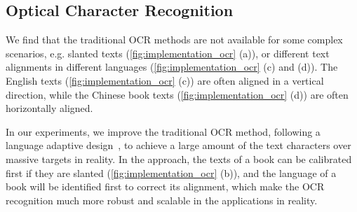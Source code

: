 



\subsection{Optical Character Recognition}


We find that the traditional OCR methods are not available for some complex scenarios,
e.g. slanted texts (\autoref{fig:implementation_ocr} (a)), %
or different text alignments in different languages (\autoref{fig:implementation_ocr} (c) and (d)).
The English texts (\autoref{fig:implementation_ocr} (c)) are often aligned in a vertical direction,
while the Chinese book texts (\autoref{fig:implementation_ocr} (d)) are often horizontally aligned.

In our experiments,
we improve the traditional OCR method, following a language adaptive design~\cite{Ling2018},
to achieve a large amount of the text characters over massive targets in reality.
In the approach, the texts of a book can be calibrated first if they are slanted (\autoref{fig:implementation_ocr} (b)),
and the language of a book will be identified first to correct its alignment,
which make the OCR recognition much more robust and scalable in the applications in reality.

